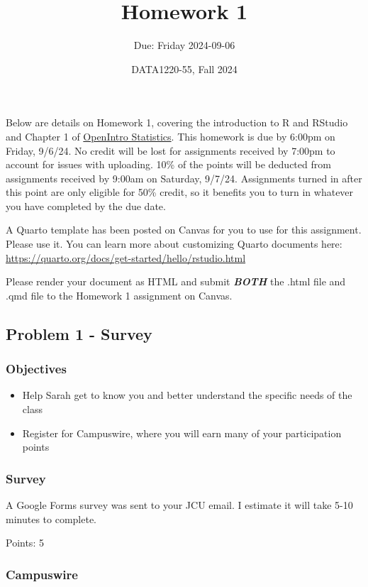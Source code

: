 \documentclass[
  letterpaper,
  DIV=11,
  numbers=noendperiod]{scrartcl}
\title{Homework 1}
\subtitle{Due: Friday 2024-09-06}
\author{DATA1220-55, Fall 2024}
\date{}
\begin{document}
\maketitle

Below are details on Homework 1, covering the introduction to R and
RStudio and Chapter 1 of
\href{https://www.openintro.org/book/os/}{OpenIntro Statistics}. This
homework is due by 6:00pm on Friday, 9/6/24. No credit will be lost for
assignments received by 7:00pm to account for issues with uploading.
10\% of the points will be deducted from assignments received by 9:00am
on Saturday, 9/7/24. Assignments turned in after this point are only
eligible for 50\% credit, so it benefits you to turn in whatever you
have completed by the due date.

A Quarto template has been posted on Canvas for you to use for this
assignment. Please use it. You can learn more about customizing Quarto
documents here:
\url{https://quarto.org/docs/get-started/hello/rstudio.html}

Please render your document as HTML and submit \textbf{\emph{BOTH}} the
.html file and .qmd file to the Homework 1 assignment on Canvas.

\subsection{Problem 1 - Survey}\label{problem-1---survey}

\subsubsection{Objectives}\label{objectives}

\begin{itemize}
\item
  Help Sarah get to know you and better understand the specific needs of
  the class
\item
  Register for Campuswire, where you will earn many of your
  participation points
\end{itemize}

\subsubsection{Survey}\label{survey}

A Google Forms survey was sent to your JCU email. I estimate it will
take 5-10 minutes to complete.

Points: 5

\subsubsection{Campuswire}\label{campuswire}
\end{document}
